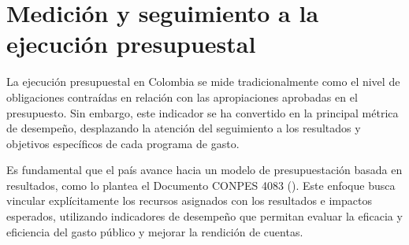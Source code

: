 

\section{Medición y seguimiento a la ejecución presupuestal}

La ejecución presupuestal en Colombia se mide tradicionalmente como el nivel de obligaciones contraídas en relación con las apropiaciones aprobadas en el presupuesto. Sin embargo, este indicador se ha convertido en la principal métrica de desempeño, desplazando la atención del seguimiento a los resultados y objetivos específicos de cada programa de gasto.

Es fundamental que el país avance hacia un modelo de presupuestación basada en resultados, como lo plantea el Documento CONPES 4083 (\cite{conpes4083}). Este enfoque busca vincular explícitamente los recursos asignados con los resultados e impactos esperados, utilizando indicadores de desempeño que permitan evaluar la eficacia y eficiencia del gasto público y mejorar la rendición de cuentas.

